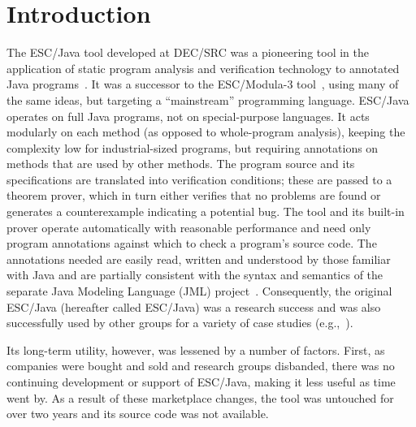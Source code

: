 \documentclass{llncs}
\begin{document}



\section{Introduction}

The ESC/Java tool developed at DEC/SRC was a pioneering tool in the
application of static program analysis and verification technology to
annotated Java programs~\cite{Flanagan-etal02}.  It was a successor to
the ESC/Modula-3 tool~\cite{ESCModula3}, using many of the same
ideas, but targeting a ``mainstream'' programming language.  ESC/Java 
operates on full Java programs, not on special-purpose languages.  It acts
modularly on each method (as opposed to whole-program analysis), 
keeping the complexity low for industrial-sized programs, but requiring 
annotations on methods that are used by other methods.  The program source
and its specifications are translated into verification conditions; these are passed
to a theorem prover, which in turn either verifies that no problems are found or
generates a counterexample indicating a potential bug. The tool
and its built-in prover operate automatically with reasonable
performance and need only program annotations against which to check
a program's source code.  The annotations needed are easily read,
written and understood by those familiar with Java and are partially
consistent with the syntax and semantics of the separate Java Modeling
Language (JML) project~\cite{jmlpapers,Leavens-etal00}.  Consequently,
the original ESC/Java (hereafter called ESC/Java) was a research
success and was also successfully used by other groups for a variety
of case studies (e.g.,~\cite{Hub03,HOP04}).


Its long-term utility, however, was lessened by a number of factors.
First, as companies were bought and sold and research groups
disbanded, there was no continuing development or support of ESC/Java,
making it less useful as time went by.  As a result of these
marketplace changes, the tool was untouched for over two years and its
source code was not available.
\end{document}
